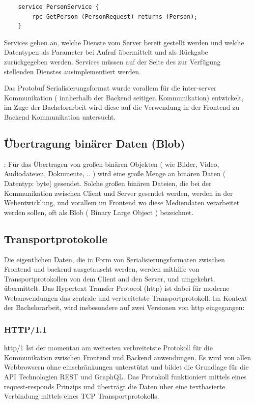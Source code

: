 \begin{verbatim}
	service PersonService {
		rpc GetPerson (PersonRequest) returns (Person);
	}
\end{verbatim}

Services geben an, welche Dienste vom Server bereit gestellt werden und welche Datentypen als Parameter bei Aufruf übermittelt und als Rückgabe zurückgegeben werden. Services müssen auf der Seite des zur Verfügung stellenden Dienstes ausimplementiert werden.

Das Protobuf Serialisierungsformat wurde vorallem für die inter-server Kommunikation ( innherhalb der Backend seitigen Kommunikation) entwickelt, im Zuge der Bachelorarbeit wird diese auf die Verwendung in der Frontend zu Backend Kommunikation untersucht.

\subsection{Übertragung binärer Daten (Blob)}:
Für das Übertragen von großen binären Objekten ( wie Bilder, Video, Audiodateien, Dokumente, .. ) wird eine große Menge an binären Daten ( Datentyp: byte) gesendet. Solche großen binären Dateien, die bei der Kommunikation zwischen Client und Server gesendet werden, werden in der Webentwicklung, und vorallem im Frontend wo diese Mediendaten verarbeitet werden sollen, oft als Blob ( Binary Large Object ) bezeichnet. 


\subsection{Transportprotokolle}
Die eigentlichen Daten, die in Form von Serialisierungsformaten zwischen Frontend und backend ausgetauscht werden, werden mithilfe von Transportprotokollen von dem Client and den Server, und umgekehrt, übermittelt. Das Hypertext Transfer Protocol (http) ist dabei für moderne Webanwendungen das zentrale und verbreitetste Transportprotokoll. Im Kontext der Bachelorarbeit, wird insbesondere auf zwei Versionen von http eingegangen:

\subsubsection{HTTP/1.1}

http/1 Ist der momentan am weitesten verbreitetste Protokoll für die Kommunikation zwischen Frontend und Backend anwendungen. Es wird von allen Webbrowsern ohne einschränkungen unterstützt und bildet die Grundlage für die API Technologien REST und GraphQL. Das Protokoll funktioniert mittels eines request-responds Prinzips und überträgt die Daten über eine textbasierte Verbindung mittels eines TCP Transportprotokolls. 

